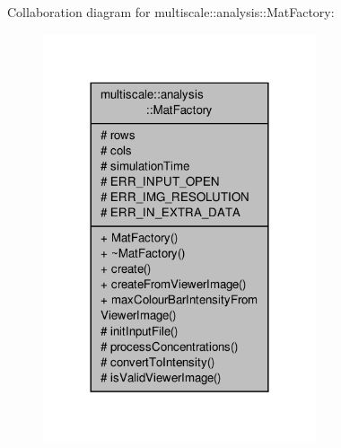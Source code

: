 Collaboration diagram for multiscale\-:\-:analysis\-:\-:Mat\-Factory\-:\nopagebreak
\begin{figure}[H]
\begin{center}
\leavevmode
\includegraphics[width=228pt]{classmultiscale_1_1analysis_1_1MatFactory__coll__graph}
\end{center}
\end{figure}
